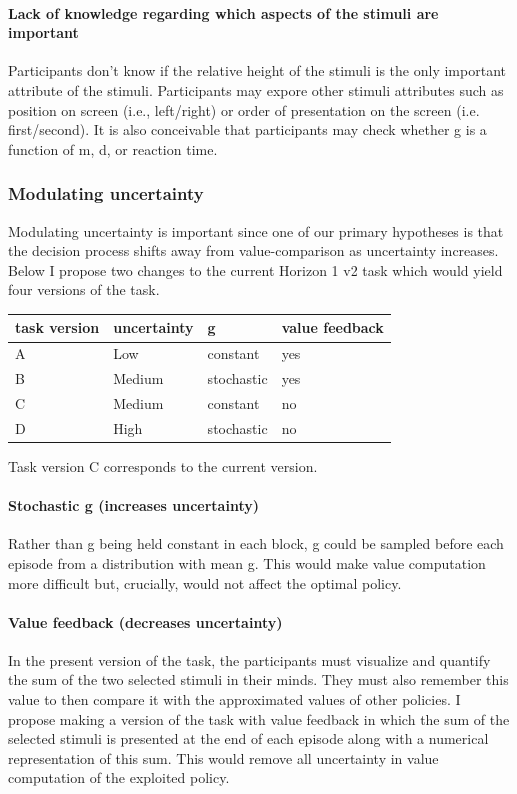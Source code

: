 \documentclass[11pt]{article}
\begin{document}
\paragraph{Lack of knowledge regarding which aspects of the stimuli are important}
\label{sec:org01d1ce3}
Participants don't know if the relative height of the stimuli is the only important attribute of the stimuli. Participants may expore other stimuli attributes such as position on screen (i.e., left/right) or order of presentation on the screen (i.e. first/second). It is also conceivable that participants may check whether g is a function of m, d, or reaction time.
\subsubsection{Modulating uncertainty}
\label{sec:orgcadde48}
Modulating uncertainty is important since one of our primary hypotheses is that the decision process shifts away from value-comparison as uncertainty increases. Below I propose two changes to the current Horizon 1 v2 task which would yield four versions of the task.

\begin{table}[htbp]
\label{Table 3}
\centering
\begin{tabular}{llll}
task version & uncertainty & g & value feedback\\
\hline
A & Low & constant & yes\\
B & Medium & stochastic & yes\\
C & Medium & constant & no\\
D & High & stochastic & no\\
\end{tabular}
\end{table}
Task version C corresponds to the current version.
\paragraph{Stochastic g (increases uncertainty)}
\label{sec:org89c95e8}
Rather than g being held constant in each block, g could be sampled before each episode from a distribution with mean g. This would make value computation more difficult but, crucially, would not affect the optimal policy.
\paragraph{Value feedback (decreases uncertainty)}
\label{sec:org51c065d}
In the present version of the task, the participants must visualize and quantify the sum of the two selected stimuli in their minds. They must also remember this value to then compare it with the approximated values of other policies. I propose making a version of the task with value feedback in which the sum of the selected stimuli is presented at the end of each episode along with a numerical representation of this sum. This would remove all uncertainty in value computation of the exploited policy.
\end{document}
